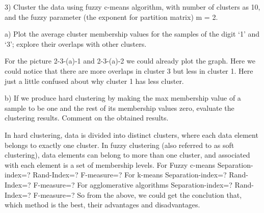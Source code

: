 \documentclass[]{article}
\begin{document}
3) Cluster the data using fuzzy c-means algorithm, with number of clusters as 10, and the fuzzy parameter (the exponent for partition matrix) m = 2.

a) Plot the average cluster membership values for the samples of the digit ‘1’ and ‘3’; explore their overlaps with other clusters.

For the picture 2-3-(a)-1 and 2-3-(a)-2 we could already plot the graph.
Here we could notice that there are more overlaps in cluster 3 but less in cluster 1.
Here just a little confused about why cluster 1 has less cluster. 
 
 
b) If we produce hard clustering by making the max membership value of a sample to be one and the rest of its membership values zero, evaluate the clustering results. Comment on the obtained results.

In hard clustering, data is divided into distinct clusters, where each data element belongs to exactly one cluster. In fuzzy clustering (also referred to as soft clustering), data elements can belong to more than one cluster, and associated with each element is a set of membership levels. 
For Fuzzy c-means
Separation-index=?
Rand-Index=?
F-measure=?
For k-means
Separation-index=?
Rand-Index=?
F-measure=?
For agglomerative algorithms
Separation-index=?
Rand-Index=?
F-measure=?
So from the above, we could get the conclution that, which method is the best, their advantages and disadvantages.

%
\end{document}
